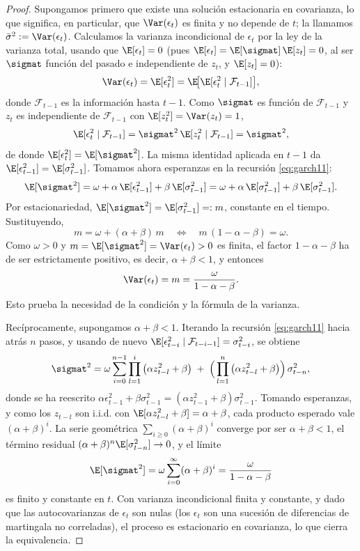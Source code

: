 \begin{proof}
Supongamos primero que existe una solución estacionaria en covarianza, lo que significa, en particular, que $\Var(\epsilon_t)$ es finita y no depende de $t$; la llamamos $\bar{\sigma}^2 := \Var(\epsilon_t)$. Calculamos la varianza incondicional de $\epsilon_t$ por la ley de la varianza total, usando que $\E[\epsilon_t] = 0$ (pues $\E[\epsilon_t] = \E[\sigmat]\,\E[z_t] = 0$, al ser $\sigmat$ función del pasado e independiente de $z_t$, y $\E[z_t]=0$):
\[
\Var(\epsilon_t) = \E[\epsilon_t^2] = \E\!\big[\E[\epsilon_t^2 \mid \mathcal{F}_{t-1}]\big],
\]
donde $\mathcal{F}_{t-1}$ es la información hasta $t-1$. Como $\sigmat$ es función de $\mathcal{F}_{t-1}$ y $z_t$ es independiente de $\mathcal{F}_{t-1}$ con $\E[z_t^2] = \Var(z_t) = 1$,
\[
\E[\epsilon_t^2 \mid \mathcal{F}_{t-1}] = \sigmat^2\, \E[z_t^2 \mid \mathcal{F}_{t-1}] = \sigmat^2,
\]
de donde $\E[\epsilon_t^2] = \E[\sigmat^2]$. La misma identidad aplicada en $t-1$ da $\E[\epsilon_{t-1}^2] = \E[\sigma_{t-1}^2]$. Tomamos ahora esperanzas en la recursión \eqref{eq:garch11}:
\[
\E[\sigmat^2] = \omega + \alpha\, \E[\epsilon_{t-1}^2] + \beta\, \E[\sigma_{t-1}^2]
= \omega + \alpha\, \E[\sigma_{t-1}^2] + \beta\, \E[\sigma_{t-1}^2].
\]
Por estacionariedad, $\E[\sigmat^2] = \E[\sigma_{t-1}^2] =: m$, constante en el tiempo. Sustituyendo,
\[
m = \omega + (\alpha + \beta)\, m
\quad\Longleftrightarrow\quad
m\,(1 - \alpha - \beta) = \omega.
\]
Como $\omega > 0$ y $m = \E[\sigmat^2] = \Var(\epsilon_t) > 0$ es finita, el factor $1 - \alpha - \beta$ ha de ser estrictamente positivo, es decir, $\alpha + \beta < 1$, y entonces
\[
\Var(\epsilon_t) = m = \frac{\omega}{1 - \alpha - \beta}.
\]
Esto prueba la necesidad de la condición y la fórmula de la varianza.

Recíprocamente, supongamos $\alpha + \beta < 1$. Iterando la recursión \eqref{eq:garch11} hacia atrás $n$ pasos, y usando de nuevo $\E[\epsilon_{t-i}^2 \mid \mathcal{F}_{t-i-1}] = \sigma_{t-i}^2$, se obtiene
\[
\sigmat^2 = \omega \sum_{i=0}^{n-1} \prod_{l=1}^{i}\big(\alpha z_{t-l}^2 + \beta\big) \;+\; \Big(\prod_{l=1}^{n}\big(\alpha z_{t-l}^2 + \beta\big)\Big)\,\sigma_{t-n}^2,
\]
donde se ha reescrito $\alpha \epsilon_{t-1}^2 + \beta \sigma_{t-1}^2 = (\alpha z_{t-1}^2 + \beta)\sigma_{t-1}^2$. Tomando esperanzas, y como los $z_{t-l}$ son i.i.d. con $\E[\alpha z_{t-l}^2 + \beta] = \alpha + \beta$, cada producto esperado vale $(\alpha+\beta)^i$. La serie geométrica $\sum_{i\ge 0}(\alpha+\beta)^i$ converge por ser $\alpha+\beta<1$, el término residual $(\alpha+\beta)^n \E[\sigma_{t-n}^2] \to 0$, y el límite
\[
\E[\sigmat^2] = \omega \sum_{i=0}^{\infty} (\alpha+\beta)^i = \frac{\omega}{1-\alpha-\beta}
\]
es finito y constante en $t$. Con varianza incondicional finita y constante, y dado que las autocovarianzas de $\epsilon_t$ son nulas (los $\epsilon_t$ son una sucesión de diferencias de martingala no correladas), el proceso es estacionario en covarianza, lo que cierra la equivalencia.
\end{proof}

